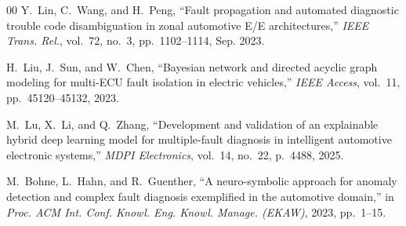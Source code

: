 \documentclass[conference]{IEEEtran}
\begin{document}
\begin{thebibliography}{00}
Y.~Lin, C.~Wang, and H.~Peng, ``Fault propagation and automated diagnostic trouble code disambiguation in zonal automotive E/E architectures,'' \emph{IEEE Trans. Rel.}, vol.~72, no.~3, pp.~1102--1114, Sep. 2023.

H.~Liu, J.~Sun, and W.~Chen, ``Bayesian network and directed acyclic graph modeling for multi-ECU fault isolation in electric vehicles,'' \emph{IEEE Access}, vol.~11, pp.~45120--45132, 2023.

M.~Lu, X.~Li, and Q.~Zhang, ``Development and validation of an explainable hybrid deep learning model for multiple-fault diagnosis in intelligent automotive electronic systems,'' \emph{MDPI Electronics}, vol.~14, no.~22, p.~4488, 2025.

M.~Bohne, L.~Hahn, and R.~Guenther, ``A neuro-symbolic approach for anomaly detection and complex fault diagnosis exemplified in the automotive domain,'' in \emph{Proc. ACM Int. Conf. Knowl. Eng. Knowl. Manage. (EKAW)}, 2023, pp.~1--15.

\end{thebibliography}
\end{document}
